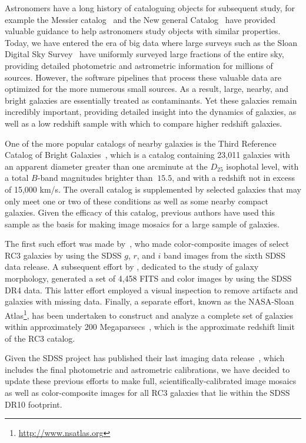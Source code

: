 \documentclass[authoryear, 12pt, 5p, times]{elsarticle}
\begin{document}
Astronomers have a long history of cataloguing objects for subsequent study, for example the Messier catalog~\citep{messcat} and the New general Catalog~\citep[NGC;][]{ngccat} have provided valuable guidance to help astronomers study objects with similar properties. Today, we have entered the era of big data where large surveys such as the Sloan Digital Sky Survey~\citep[SDSS;][]{sdsstech} have uniformly surveyed large fractions of the entire sky, providing detailed photometric and astrometric information for millions of sources. However, the software pipelines that  process these valuable data are optimized for the more numerous small sources. As a result, large, nearby, and bright galaxies are essentially treated as contaminants. Yet these galaxies remain incredibly important, providing detailed insight into the dynamics of galaxies,
 as well as a low redshift sample with which to compare higher redshift galaxies. 

One of the more popular catalogs of nearby galaxies is the Third Reference Catalog of Bright Galaxies~\citep[RC3;][]{rc31991}, which is a catalog containing 23,011 galaxies with an apparent diameter greater than one arcminute at the $D_{25}$ isophotal level, with a total $B$-band magnitudes brighter than $~15.5$, and with a redshift not in excess of 15,000 km/s. The overall catalog is supplemented by selected galaxies that may only meet one or two of these conditions as well as some  nearby compact galaxies. Given the efficacy of this catalog, previous authors have used this sample as the basis for making image mosaics for a large sample of galaxies. 

The first such effort was made by~\cite{hbrc3}, who made color-composite images of select RC3 galaxies by using the SDSS $g$, $r$, and $i$ band images from the sixth SDSS data release. A subsequent effort by \citet{efigi}, dedicated to the study of galaxy morphology, generated a set of 4,458 FITS and color images by using the SDSS DR4 data. This latter effort employed a visual inspection to remove artifacts and galaxies with missing data. Finally, a separate effort, known as the NASA-Sloan Atlas\footnote{\url{http://www.nsatlas.org}}, has been undertaken to construct and analyze a complete set of galaxies within approximately 200 Megaparsecs~\citep{nsa}, which is the approximate redshift limit of the RC3 catalog.

Given the SDSS project has published their last imaging data release~\citep[DR10; ][]{dr10}, which includes the final photometric and astrometric calibrations, we have decided to update these previous efforts to make full, scientifically-calibrated image mosaics as well as color-composite images for all RC3 galaxies that lie within the SDSS DR10 footprint. 
\end{document}
